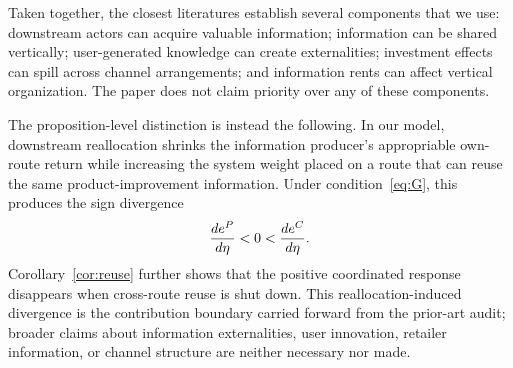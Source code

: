 Taken together, the closest literatures establish several components that we use: downstream actors can acquire valuable information; information can be shared vertically; user-generated knowledge can create externalities; investment effects can spill across channel arrangements; and information rents can affect vertical organization. The paper does not claim priority over any of these components.

The proposition-level distinction is instead the following. In our model, downstream reallocation shrinks the information producer's appropriable own-route return while increasing the system weight placed on a route that can reuse the same product-improvement information. Under condition~\eqref{eq:G}, this produces the sign divergence
\[
    \frac{de^{P}}{d\eta}<0<\frac{de^{C}}{d\eta}.
\]
Corollary~\ref{cor:reuse} further shows that the positive coordinated response disappears when cross-route reuse is shut down. This reallocation-induced divergence is the contribution boundary carried forward from the prior-art audit; broader claims about information externalities, user innovation, retailer information, or channel structure are neither necessary nor made.
